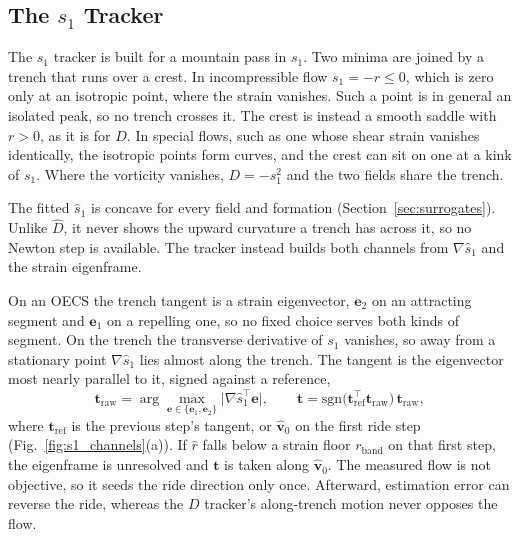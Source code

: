 \documentclass[lettersize,journal]{IEEEtran}
\begin{document}
\subsection{The $s_1$ Tracker}
\label{sec:s1_controller}

The $s_1$ tracker is built for a mountain pass in $s_1$. Two
minima are joined by a trench that runs over a crest. In incompressible
flow $s_1 = -r \leq 0$, which is zero only at an isotropic point, where
the strain vanishes. Such a point is in general an isolated peak, so no
trench crosses it. The crest is instead a smooth saddle with $r > 0$, as
it is for $D$. In special flows, such as one whose shear strain vanishes
identically, the isotropic points form curves, and the crest can sit on
one at a kink of $s_1$. Where the vorticity vanishes, $D = -s_1^2$ and
the two fields share the trench.

The fitted $\hat{s}_1$ is concave for every field and formation
(Section~\ref{sec:surrogates}). Unlike $\hat{D}$, it never shows the
upward curvature a trench has across it, so no Newton step is available.
The tracker instead builds both channels from $\nabla\hat{s}_1$ and the
strain eigenframe.

On an OECS the trench tangent is a strain eigenvector, $\mathbf{e}_2$
on an attracting segment and $\mathbf{e}_1$ on a repelling one, so no
fixed choice serves both kinds of segment. On the trench the
transverse derivative of $s_1$ vanishes, so away from a stationary point
$\nabla\hat{s}_1$ lies almost along the trench. The tangent is the
eigenvector most nearly parallel to it, signed against a reference,
\begin{equation}
    \mathbf{t}_{\mathrm{raw}} =
    \arg\max_{\mathbf{e} \in \{\mathbf{e}_1, \mathbf{e}_2\}}
    \bigl\lvert \nabla\hat{s}_1^\top \mathbf{e} \bigr\rvert,
    \qquad
    \mathbf{t} = \mathrm{sgn}\bigl(\mathbf{t}_{\mathrm{ref}}^\top
    \mathbf{t}_{\mathrm{raw}}\bigr)\,\mathbf{t}_{\mathrm{raw}},
    \label{eq:tangent_select}
\end{equation}
where $\mathbf{t}_{\mathrm{ref}}$ is the previous step's tangent, or
$\hat{\mathbf{v}}_0$ on the first ride step (Fig.~\ref{fig:s1_channels}(a)). If $\hat{r}$ falls below a
strain floor $r_{\mathrm{band}}$ on that first step, the eigenframe is
unresolved and $\mathbf{t}$ is taken along $\hat{\mathbf{v}}_0$. The measured flow is not
objective, so it seeds the ride direction only once. Afterward,
estimation error can reverse the ride, whereas the $D$ tracker's
along-trench motion never opposes the flow.
\end{document}
